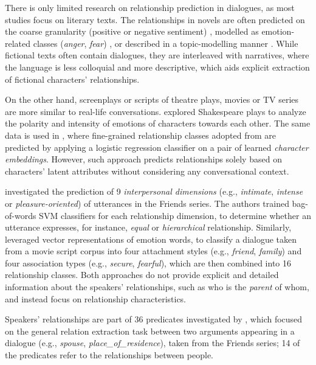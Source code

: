 There is only limited research on relationship prediction in dialogues, as most studies focus on literary texts. The relationships in novels are often predicted on the coarse granularity (positive or negative sentiment) \cite{chaturvedi2016modeling}, modelled as emotion-related classes (\textit{anger}, \textit{fear}) \cite{kim2019frowning}, or described in a topic-modelling manner \cite{iyyer2016feuding, chaturvedi2017unsupervised}. While fictional texts often contain dialogues, they are interleaved with narratives, where the language is less colloquial and more descriptive, which aids explicit extraction of fictional characters' relationships.

On the other hand, screenplays or scripts of theatre plays, movies or TV series are more similar to real-life conversations. 
\citet{nalisnick2013character} explored Shakespeare plays to analyze the polarity and intensity of emotions of characters towards each other. The same data is used in \citet{azab2019representing}, where fine-grained relationship classes adopted from \citet{massey2015annotating} are predicted by applying a logistic regression classifier on a pair of learned \emph{character embeddings}.
However, such approach predicts relationships solely based on characters' latent attributes without considering any conversational context.

\citet{rashid2018characterizing} investigated the prediction of 9 \emph{interpersonal dimensions} (e.g., \textit{intimate}, \textit{intense} or \textit{pleasure-oriented}) \cite{wish1976perceived} of utterances in the Friends series.
The authors trained bag-of-words SVM classifiers for each relationship dimension, to determine whether an utterance expresses, for instance, \emph{equal} or \emph{hierarchical} relationship. 
Similarly, \citet{qamar2021relationship} leveraged vector representations of emotion
words, to classify a dialogue taken from a movie script corpus into four attachment styles (e.g., \emph{friend}, \emph{family}) and four association types (e.g., \emph{secure}, \emph{fearful}), which are then combined into 16 relationship classes. Both approaches do not provide explicit and detailed information about the speakers' relationships, such as who is the \emph{parent} of whom, and instead focus on relationship characteristics.

Speakers' relationships are part of 36 predicates investigated by \citet{yu-etal-2020-dialogue}, which focused on the general relation extraction task between two arguments appearing in a dialogue (e.g., \emph{spouse}, \emph{place\_of\_residence}), taken from the Friends series; 14 of the predicates refer to the relationships between people.
